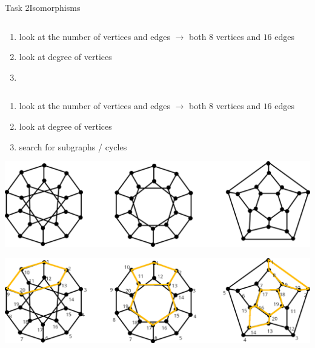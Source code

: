 \begin{frame}[allowframebreaks]{Task 2}{Isomorphisms}
\begin{solutionnoinc}
\begin{columns}
\begin{column}{0.5\textwidth}
      \end{column}
    \end{columns}
    \vspace{0.5cm}
    \begin{enumerate}
      \item look at the \alert{number} of \alert{vertices} and \alert{edges} $\rightarrow$ both $8$ vertices and $16$ edges
      \item look at \alert{degree} of vertices
      \item[]
    \end{enumerate}
  \end{solutionnoinc}
  \begin{solution}
    \begin{columns}
      \begin{column}{0.5\textwidth}
      \end{column}
      \begin{column}{0.5\textwidth}
      \end{column}
    \end{columns}
    \vspace{0.5cm}
    \begin{enumerate}
      \item look at the \alert{number} of \alert{vertices} and \alert{edges} $\rightarrow$ both $8$ vertices and $16$ edges
      \item look at \alert{degree} of vertices
      \item search for \alert{subgraphs} / \alert{cycles}
    \end{enumerate}
  \end{solution}
  \begin{requirementsnoinc}
    \includegraphics[width=\textwidth]{./figures/isomorphism2.png}
  \end{requirementsnoinc}
  \begin{solutionnoinc}
    \includegraphics[width=\textwidth]{./figures/isomorphism2_sol.png}

\end{solutionnoinc}
\end{frame}
